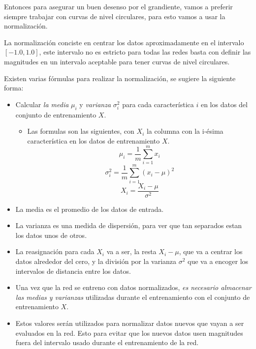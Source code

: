 Entonces para asegurar un buen desenso por el grandiente, vamos a preferir siempre trabajar con curvas de nivel circulares, para esto vamos a usar la normalización.

La normalización conciste en centrar los datos aproximadamente en el intervalo $[-1.0, 1.0]$, este intervalo no es estricto para todas las redes basta con definir las magnitudes en un intervalo aceptable para tener curvas de nivel circulares. 

Existen varias fórmulas para realizar la normalización, se sugiere la siguiente forma:
\begin{itemize}
 \item Calcular \emph{la media} $\mu_i$ y \emph{varianza} $\sigma_{i}^2$ para cada característica $i$ en los datos del conjunto de entrenamiento $X$.
 \begin{itemize}
  \item Las formulas son las siguientes, con $X_i$ la columna con la i-ésima característica en los datos de entrenamiento $X$.\\
  \begin{equation}
   \mu_{i} = \dfrac{1}{m}\sum_{i=1}^{m}x_{i} 
  \end{equation}
  \begin{equation}
   \sigma_{i}^{2} = \dfrac{1}{m}\sum_{i=1}^{m}(x_{i}-\mu)^2 
  \end{equation}
  \begin{equation}
   X_{i} = \dfrac{X_{i}-\mu}{\sigma^{2}}
  \label{eq:tres}
  \end{equation}
 \end{itemize}
    \item La media es el promedio de los datos de entrada.
    \item La varianza es una medida de dispersión, para ver que tan separados estan los datos unos de otros.
    \item La reasignación para cada $X_i$ va a ser, la resta $X_i -\mu$, que va a centrar los datos alrededor del cero, y la división por la varianza $\sigma^2$ que va a encoger los intervalos de distancia entre los datos. 
\end{itemize}

 
\begin{itemize}
 \item Una vez que la red se entreno con datos normalizados, \textit{es necesario almacenar las medias y varianzas} utilizadas durante el entrenamiento con el conjunto de entrenamiento $X$.
 \item Estos valores serán utilizados para normalizar datos nuevos que vayan a ser evaluados en la red. Esto para evitar que los nuevos datos usen magnitudes fuera del intervalo usado durante el entrenamiento de la red.
\end{itemize}

